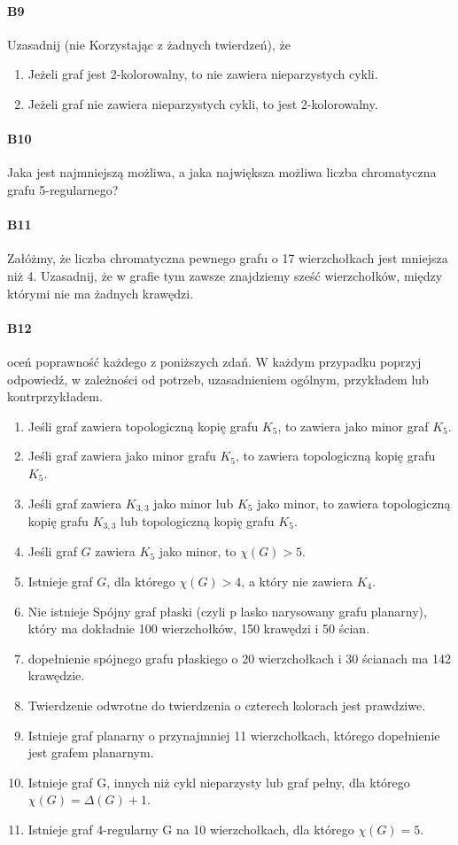 \paragraph{B9} Uzasadnij (nie Korzystając z żadnych twierdzeń), że
\begin{enumerate}[label=\alph*)]
\item Jeżeli graf jest 2-kolorowalny, to nie zawiera nieparzystych cykli.
\item Jeżeli graf nie zawiera nieparzystych cykli, to jest 2-kolorowalny.
\end{enumerate}

\paragraph{B10} Jaka jest najmniejszą możliwa, a jaka największa możliwa liczba chromatyczna grafu 5-regularnego?

\paragraph{B11} Załóżmy, że liczba chromatyczna pewnego grafu o 17 wierzchołkach jest mniejsza niż 4. Uzasadnij, że w grafie tym zawsze znajdziemy sześć wierzchołków, między którymi nie ma żadnych krawędzi.

\paragraph{B12} oceń poprawność każdego z poniższych zdań. W każdym przypadku poprzyj odpowiedź, w zależności od potrzeb, uzasadnieniem ogólnym, przykładem lub kontrprzykładem.
\begin{enumerate}[label=\alph*)]
\item Jeśli graf zawiera topologiczną kopię grafu $K_5$, to zawiera jako minor graf $K_5$.
\item Jeśli graf zawiera jako minor grafu $K_5$, to zawiera topologiczną kopię grafu $K_5$.
\item Jeśli graf zawiera $K_{3,3}$ jako minor lub $K_5$ jako minor, to zawiera topologiczną kopię grafu $K_{3,3}$ lub topologiczną kopię grafu $K_5$.
\item Jeśli graf $G$ zawiera $K_5$ jako minor, to $\chi (G) > 5$.
\item Istnieje graf $G$, dla którego $\chi (G) > 4$, a który nie zawiera $K_4$.
\item Nie istnieje Spójny graf płaski (czyli p lasko narysowany grafu planarny), który ma dokładnie 100 wierzchołków, 150 krawędzi i 50 ścian.
\item dopełnienie spójnego grafu płaskiego o 20 wierzchołkach i 30 ścianach ma 142 krawędzie.
\item Twierdzenie odwrotne do twierdzenia o czterech kolorach jest prawdziwe.
\item Istnieje graf planarny o przynajmniej 11 wierzchołkach, którego dopełnienie jest grafem planarnym.
\item Istnieje graf G, innych niż cykl nieparzysty lub graf pełny, dla którego $\chi (G) = \Delta (G) + 1$.
\item Istnieje graf 4-regularny G na 10 wierzchołkach, dla którego $\chi (G) = 5$.
\end{enumerate}


